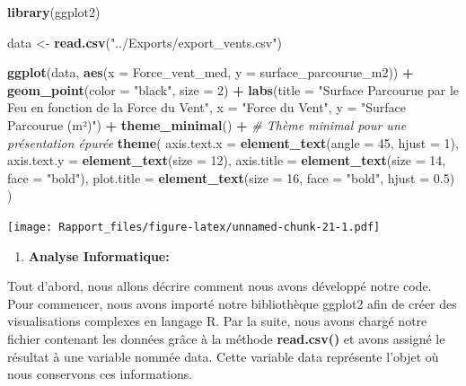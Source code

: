 \documentclass[
]{article}
\newenvironment{Shaded}{\begin{snugshade}}{\end{snugshade}}
\newcommand{\AttributeTok}[1]{\textcolor[rgb]{0.13,0.29,0.53}{#1}}
\newcommand{\CommentTok}[1]{\textcolor[rgb]{0.56,0.35,0.01}{\textit{#1}}}
\newcommand{\DecValTok}[1]{\textcolor[rgb]{0.00,0.00,0.81}{#1}}
\newcommand{\FloatTok}[1]{\textcolor[rgb]{0.00,0.00,0.81}{#1}}
\newcommand{\FunctionTok}[1]{\textcolor[rgb]{0.13,0.29,0.53}{\textbf{#1}}}
\newcommand{\NormalTok}[1]{#1}
\newcommand{\OtherTok}[1]{\textcolor[rgb]{0.56,0.35,0.01}{#1}}
\newcommand{\SpecialCharTok}[1]{\textcolor[rgb]{0.81,0.36,0.00}{\textbf{#1}}}
\newcommand{\StringTok}[1]{\textcolor[rgb]{0.31,0.60,0.02}{#1}}
\providecommand{\tightlist}{%
  \setlength{\itemsep}{0pt}\setlength{\parskip}{0pt}}
\begin{document}
\begin{Shaded}
\begin{Highlighting}[]
\FunctionTok{library}\NormalTok{(ggplot2)}

\NormalTok{data }\OtherTok{\textless{}{-}} \FunctionTok{read.csv}\NormalTok{(}\StringTok{"../Exports/export\_vents.csv"}\NormalTok{)}

\FunctionTok{ggplot}\NormalTok{(data, }\FunctionTok{aes}\NormalTok{(}\AttributeTok{x =}\NormalTok{ Force\_vent\_med, }\AttributeTok{y =}\NormalTok{ surface\_parcourue\_m2)) }\SpecialCharTok{+}
  \FunctionTok{geom\_point}\NormalTok{(}\AttributeTok{color =} \StringTok{"black"}\NormalTok{, }\AttributeTok{size =} \DecValTok{2}\NormalTok{) }\SpecialCharTok{+} 
  \FunctionTok{labs}\NormalTok{(}\AttributeTok{title =} \StringTok{"Surface Parcourue par le Feu en fonction de la Force du Vent"}\NormalTok{, }
       \AttributeTok{x =} \StringTok{"Force du Vent"}\NormalTok{, }
       \AttributeTok{y =} \StringTok{"Surface Parcourue (m²)"}\NormalTok{) }\SpecialCharTok{+}
  \FunctionTok{theme\_minimal}\NormalTok{() }\SpecialCharTok{+}  \CommentTok{\# Thème minimal pour une présentation épurée}
  \FunctionTok{theme}\NormalTok{(}
    \AttributeTok{axis.text.x =} \FunctionTok{element\_text}\NormalTok{(}\AttributeTok{angle =} \DecValTok{45}\NormalTok{, }\AttributeTok{hjust =} \DecValTok{1}\NormalTok{),}
    \AttributeTok{axis.text.y =} \FunctionTok{element\_text}\NormalTok{(}\AttributeTok{size =} \DecValTok{12}\NormalTok{),}
    \AttributeTok{axis.title =} \FunctionTok{element\_text}\NormalTok{(}\AttributeTok{size =} \DecValTok{14}\NormalTok{, }\AttributeTok{face =} \StringTok{"bold"}\NormalTok{),}
    \AttributeTok{plot.title =} \FunctionTok{element\_text}\NormalTok{(}\AttributeTok{size =} \DecValTok{16}\NormalTok{, }\AttributeTok{face =} \StringTok{"bold"}\NormalTok{, }\AttributeTok{hjust =} \FloatTok{0.5}\NormalTok{)}
\NormalTok{  )}
\end{Highlighting}
\end{Shaded}

\texttt{[image: Rapport\_files/figure-latex/unnamed-chunk-21-1.pdf]}

\begin{enumerate}
\def\labelenumi{\arabic{enumi}.}
\tightlist
\item
  \textbf{Analyse Informatique:}
\end{enumerate}

Tout d'abord, nous allons décrire comment nous avons développé notre
code. Pour commencer, nous avons importé notre bibliothèque ggplot2 afin
de créer des visualisations complexes en langage R. Par la suite, nous
avons chargé notre fichier contenant les données grâce à la méthode
\textbf{read.csv()} et avons assigné le résultat à une variable nommée
data. Cette variable data représente l'objet où nous conservons ces
informations.
\end{document}
